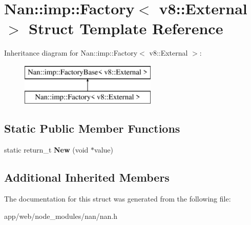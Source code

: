 \hypertarget{struct_nan_1_1imp_1_1_factory_3_01v8_1_1_external_01_4}{}\section{Nan\+:\+:imp\+:\+:Factory$<$ v8\+:\+:External $>$ Struct Template Reference}
\label{struct_nan_1_1imp_1_1_factory_3_01v8_1_1_external_01_4}
Inheritance diagram for Nan\+:\+:imp\+:\+:Factory$<$ v8\+:\+:External $>$\+:\begin{figure}[H]
\begin{center}
\leavevmode
\includegraphics[height=2.000000cm]{struct_nan_1_1imp_1_1_factory_3_01v8_1_1_external_01_4}
\end{center}
\end{figure}
\subsection*{Static Public Member Functions}
\begin{DoxyCompactItemize}
\item 
\mbox{\label{struct_nan_1_1imp_1_1_factory_3_01v8_1_1_external_01_4_a56fd89211ad234d1c9311e5cadfc6994}} 
static return\+\_\+t {\bfseries New} (void $\ast$value)
\end{DoxyCompactItemize}
\subsection*{Additional Inherited Members}


The documentation for this struct was generated from the following file\+:\begin{DoxyCompactItemize}
\item 
app/web/node\+\_\+modules/nan/nan.\+h\end{DoxyCompactItemize}
